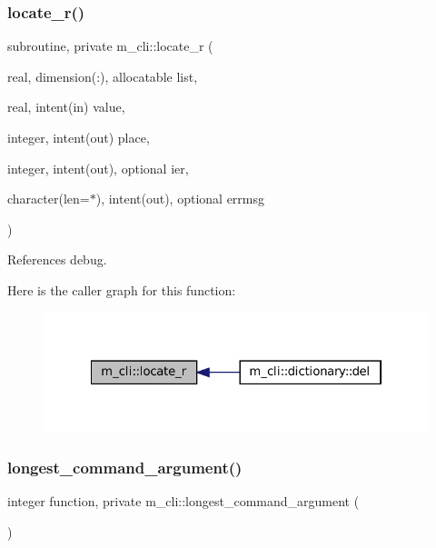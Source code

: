 \subsubsection{\texorpdfstring{locate\+\_\+r()}{locate\_r()}}
{\footnotesize\ttfamily subroutine, private m\+\_\+cli\+::locate\+\_\+r (\begin{DoxyParamCaption}\item[{real, dimension(\+:), allocatable}]{list,  }\item[{real, intent(in)}]{value,  }\item[{integer, intent(out)}]{place,  }\item[{integer, intent(out), optional}]{ier,  }\item[{character(len=$\ast$), intent(out), optional}]{errmsg }\end{DoxyParamCaption})\hspace{0.3cm}{\ttfamily [private]}}



References debug.

Here is the caller graph for this function\+:\nopagebreak
\begin{figure}[H]
\begin{center}
\leavevmode
\includegraphics[width=322pt]{namespacem__cli_ac44389e115b536069f324bffea7d2469_icgraph}
\end{center}
\end{figure}
\mbox{\label{namespacem__cli_aaf5504d3b48696a9d22fa5773c5a7d15}} 
\subsubsection{\texorpdfstring{longest\+\_\+command\+\_\+argument()}{longest\_command\_argument()}}
{\footnotesize\ttfamily integer function, private m\+\_\+cli\+::longest\+\_\+command\+\_\+argument (\begin{DoxyParamCaption}{ }\end{DoxyParamCaption})\hspace{0.3cm}{\ttfamily [private]}}

